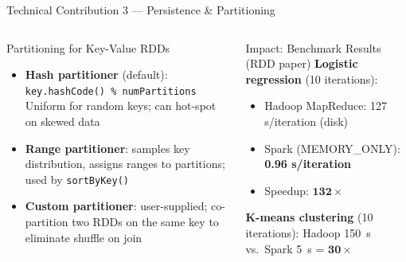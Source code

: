 \documentclass[aspectratio=169,10pt]{beamer}
\begin{document}
\begin{frame}{Technical Contribution 3 — Persistence \& Partitioning}
\begin{columns}[T]
      \begin{block}{Partitioning for Key-Value RDDs}
        \begin{itemize}
          \item \textbf{Hash partitioner} (default):
                \texttt{key.hashCode() \% numPartitions}\\
                Uniform for random keys; can hot-spot on skewed data
          \item \textbf{Range partitioner}:
                samples key distribution, assigns ranges to partitions;
                used by \texttt{sortByKey()}
          \item \textbf{Custom partitioner}:
                user-supplied; co-partition two RDDs on the same key
                to eliminate shuffle on join
        \end{itemize}
      \end{block}
      \vspace{5pt}
      \begin{exampleblock}{Impact: Benchmark Results (RDD paper)}
        \textbf{Logistic regression} (10 iterations):
        \begin{itemize}
          \item Hadoop MapReduce: 127 s/iteration (disk)
          \item Spark (MEMORY\_ONLY): \textbf{0.96 s/iteration}
          \item Speedup: $\mathbf{132\times}$
        \end{itemize}
        \textbf{K-means clustering} (10 iterations):
        Hadoop 150~s vs.\ Spark 5~s = $\mathbf{30\times}$
      \end{exampleblock}
  \end{columns}
\end{frame}
\end{document}
